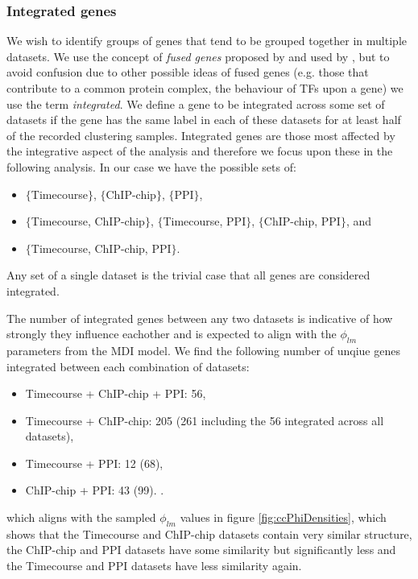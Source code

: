 \documentclass[]{article}
\begin{document}
\subsubsection{Integrated genes}
We wish to identify groups of genes that tend to be grouped together in multiple datasets. We use the concept of \emph{fused genes} proposed by \cite{savage2010discovering} and used by \cite{kirk2012bayesian}, but to avoid confusion due to other possible ideas of fused genes (e.g. those that contribute to a common protein complex, the behaviour of TFs upon a gene) we use the term \emph{integrated}. We define a gene to be integrated across some set of datasets if the gene has the same label in each of these datasets for at least half of the recorded clustering samples. Integrated genes are those most affected by the integrative aspect of the analysis and therefore we focus upon these in the following analysis. In our case we have the possible sets of:
\begin{itemize}
	\item $\{$Timecourse$\}$, $\{$ChIP-chip$\}$, $\{$PPI$\}$,
	\item $\{$Timecourse, ChIP-chip$\}$, $\{$Timecourse, PPI$\}$, $\{$ChIP-chip, PPI$\}$, and
	\item $\{$Timecourse, ChIP-chip, PPI$\}$.
\end{itemize}
Any set of a single dataset is the trivial case that all genes are considered integrated.

The number of integrated genes between any two datasets is indicative of how strongly they influence eachother and is expected to align with the $\phi_{lm}$ parameters from the MDI model. We find the following number of unqiue genes integrated between each combination of datasets:
\begin{itemize}	
	\item Timecourse + ChIP-chip + PPI: 56,
	\item Timecourse + ChIP-chip: 205 (261 including the 56 integrated across all datasets),
	\item Timecourse + PPI: 12 (68),
	\item ChIP-chip + PPI: 43 (99).
.
\end{itemize}
which aligns with the sampled $\phi_{lm}$ values in figure \ref{fig:ccPhiDensities}, which shows that the Timecourse and ChIP-chip datasets contain very similar structure, the ChIP-chip and PPI datasets have some similarity but significantly less and the Timecourse and PPI datasets have less similarity again. 
\end{document}

